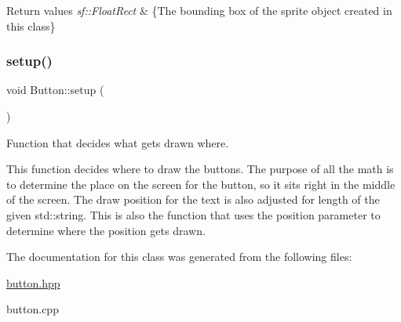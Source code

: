 \begin{DoxyRetVals}{Return values}
{\em sf\+::\+Float\+Rect} & \{The bounding box of the sprite object created in this class\} \\
\hline
\end{DoxyRetVals}
\mbox{\label{class_button_aaf14334dd0ac6a9c286aac71a765caa2}} 
\subsubsection{\texorpdfstring{setup()}{setup()}}
{\footnotesize\ttfamily void Button\+::setup (\begin{DoxyParamCaption}{ }\end{DoxyParamCaption})}



Function that decides what gets drawn where. 

This function decides where to draw the buttons. The purpose of all the math is to determine the place on the screen for the button, so it sits right in the middle of the screen. The draw position for the text is also adjusted for length of the given std\+::string. This is also the function that uses the position parameter to determine where the position gets drawn. 

The documentation for this class was generated from the following files\+:\begin{DoxyCompactItemize}
\item 
\hyperlink{button_8hpp}{button.\+hpp}\item 
button.\+cpp\end{DoxyCompactItemize}
